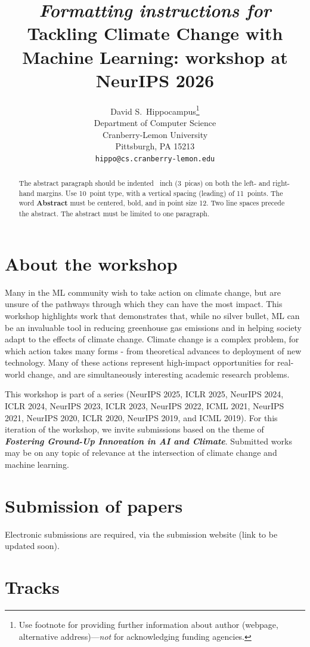 \documentclass{article}
\title{\textit{Formatting instructions for} Tackling Climate Change with Machine Learning: workshop at NeurIPS 2026}
\author{%
  David S.~Hippocampus\thanks{Use footnote for providing further information
    about author (webpage, alternative address)---\emph{not} for acknowledging
    funding agencies.} \\
  Department of Computer Science\\
  Cranberry-Lemon University\\
  Pittsburgh, PA 15213 \\
  \texttt{hippo@cs.cranberry-lemon.edu} \\
}
\begin{document}
\maketitle

\begin{abstract}
  The abstract paragraph should be indented ~inch (3~picas) on
  both the left- and right-hand margins. Use 10~point type, with a vertical
  spacing (leading) of 11~points.  The word \textbf{Abstract} must be centered,
  bold, and in point size 12. Two line spaces precede the abstract. The abstract
  must be limited to one paragraph.
\end{abstract}

\section{About the workshop}

 Many in the ML community wish to take action on climate change, but are unsure of the pathways through which they can have the most impact. This workshop highlights work that demonstrates that, while no silver bullet, ML can be an invaluable tool in reducing greenhouse gas emissions and in helping society adapt to the effects of climate change. Climate change is a complex problem, for which action takes many forms - from theoretical advances to deployment of new technology. Many of these actions represent high-impact opportunities for real-world change, and are simultaneously interesting academic research problems.
 
 This workshop is part of a series (NeurIPS 2025, ICLR 2025, NeurIPS 2024, ICLR 2024, NeurIPS 2023, ICLR 2023, NeurIPS 2022, ICML 2021, NeurIPS 2021, NeurIPS 2020, ICLR 2020, NeurIPS 2019, and ICML 2019). For this iteration of the workshop, we invite submissions based on the theme of \textbf{\textit{Fostering Ground-Up Innovation in AI and Climate}}. Submitted works may be on any topic of relevance at the intersection of climate change and machine learning.
 
\section{Submission of papers}

Electronic submissions are required, via the submission website (link to be updated soon).

\section{Tracks}
\end{document}
